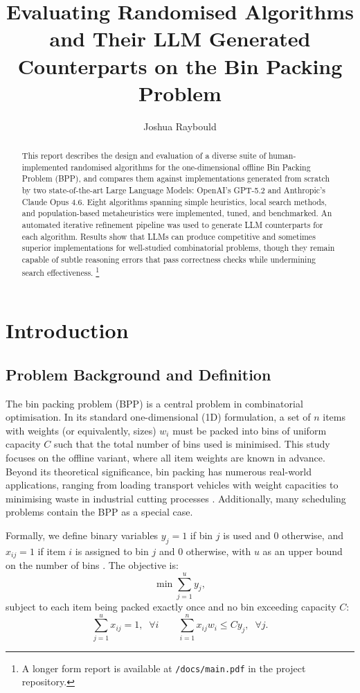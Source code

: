 \documentclass[11pt]{article}
\title{\vspace{-1.5em}Evaluating Randomised Algorithms and Their LLM Generated Counterparts on the Bin Packing Problem\vspace{-0.5em}}
\author{Joshua Raybould}
\date{}
\begin{document}
\maketitle
\vspace{-2em}

\begin{abstract}
This report describes the design and evaluation of a diverse suite of human-implemented randomised algorithms for the one-dimensional offline Bin Packing Problem (BPP), and compares them against implementations generated from scratch by two state-of-the-art Large Language Models: OpenAI's GPT-5.2 and Anthropic's Claude Opus 4.6. Eight algorithms spanning simple heuristics, local search methods, and population-based metaheuristics were implemented, tuned, and benchmarked. An automated iterative refinement pipeline was used to generate LLM counterparts for each algorithm. Results show that LLMs can produce competitive and sometimes superior implementations for well-studied combinatorial problems, though they remain capable of subtle reasoning errors that pass correctness checks while undermining search effectiveness.
\footnote{A longer form report is available at \texttt{/docs/main.pdf} in the project repository.}
\end{abstract}

\section{Introduction}

\subsection{Problem Background and Definition}

The bin packing problem (BPP) is a central problem in combinatorial optimisation. In its standard one-dimensional (1D) formulation, a set of $n$ items with weights (or equivalently, sizes) $w_i$ must be packed into bins of uniform capacity $C$ such that the total number of bins used is minimised. This study focuses on the offline variant, where all item weights are known in advance. Beyond its theoretical significance, bin packing has numerous real-world applications, ranging from loading transport vehicles with weight capacities to minimising waste in industrial cutting processes \cite{munien}. Additionally, many scheduling problems contain the BPP as a special case.

Formally, we define binary variables $y_j = 1$ if bin $j$ is used and $0$ otherwise, and $x_{ij} = 1$ if item $i$ is assigned to bin $j$ and $0$ otherwise, with $u$ as an upper bound on the number of bins \cite{maxence}. The objective is:
$$\min\sum_{j=1}^{u} y_j,$$
subject to each item being packed exactly once and no bin exceeding capacity $C$:
$$\sum_{j=1}^{u} x_{ij} = 1, \;\; \forall i \qquad \sum_{i=1}^{n} x_{ij} w_{i} \leq C y_j, \;\; \forall j.$$
\end{document}
